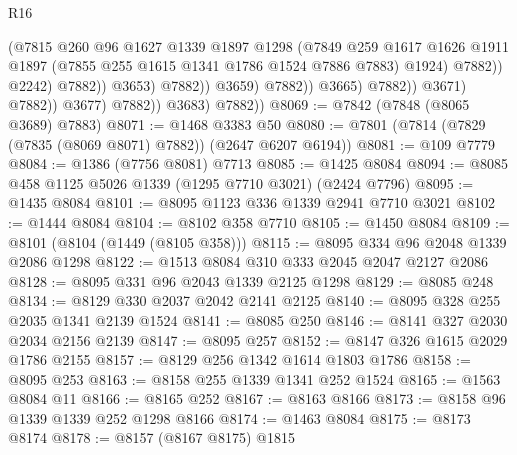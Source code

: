 \begin{lexlean}{R16}
\begin{coremodule}
                                                (@7815
                                                  @260
                                                  @96
                                                  @1627
                                                  @1339
                                                  @1897
                                                  @1298
                                                  (@7849
                                                    @259
                                                    @1617
                                                    @1626
                                                    @1911
                                                    @1897
                                                    (@7855 @255 @1615 @1341 @1786 @1524 @7886 @7883)
                                                    @1924)
                                                  @7882))
                                              @2242)
                                            @7882))
                                        @3653)
                                      @7882))
                                  @3659)
                                @7882))
                            @3665)
                          @7882))
                      @3671)
                    @7882))
                @3677)
              @7882))
          @3683)
        @7882))
@8069 := @7842 (@7848 (@8065 @3689) @7883)
@8071 := @1468 @3383 @50
@8080 := @7801 (@7814 (@7829 (@7835 (@8069 @8071) @7882)) (@2647 @6207 @6194))
@8081 := @109 @7779
@8084 := @1386 (@7756 @8081) @7713
@8085 := @1425 @8084
@8094 := @8085 @458 @1125 @5026 @1339 (@1295 @7710 @3021) (@2424 @7796)
@8095 := @1435 @8084
@8101 := @8095 @1123 @336 @1339 @2941 @7710 @3021
@8102 := @1444 @8084
@8104 := @8102 @358 @7710
@8105 := @1450 @8084
@8109 := @8101 (@8104 (@1449 (@8105 @358)))
@8115 := @8095 @334 @96 @2048 @1339 @2086 @1298
@8122 := @1513 @8084 @310 @333 @2045 @2047 @2127 @2086
@8128 := @8095 @331 @96 @2043 @1339 @2125 @1298
@8129 := @8085 @248
@8134 := @8129 @330 @2037 @2042 @2141 @2125
@8140 := @8095 @328 @255 @2035 @1341 @2139 @1524
@8141 := @8085 @250
@8146 := @8141 @327 @2030 @2034 @2156 @2139
@8147 := @8095 @257
@8152 := @8147 @326 @1615 @2029 @1786 @2155
@8157 := @8129 @256 @1342 @1614 @1803 @1786
@8158 := @8095 @253
@8163 := @8158 @255 @1339 @1341 @252 @1524
@8165 := @1563 @8084 @11
@8166 := @8165 @252
@8167 := @8163 @8166
@8173 := @8158 @96 @1339 @1339 @252 @1298 @8166
@8174 := @1463 @8084
@8175 := @8173 @8174
@8178 := @8157 (@8167 @8175) @1815

\end{coremodule}
\end{lexlean}
